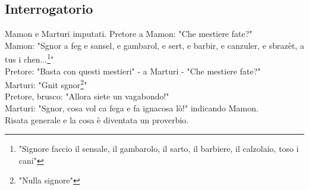 \subsection{Interrogatorio}
Mamon e Marturi imputati. Pretore a Mamon: "Che mestiere fate?"\\
Mamon: "Sgnor a feg e sansel, e gambarol, e sert, e barbir, e canzuler, e sbrazèt, a tus i chen...\footnote{"Signore faccio il sensale, il gambarolo, il sarto, il barbiere, il calzolaio, toso i cani"}"\\
Pretore: "Basta con questi mestieri" - a Marturi - "Che mestiere fate?"\\
Marturi: "Gnit sgnor\footnote{"Nulla signore"}"\\
Pretore, brusco: "Allora siete un vagabondo!"\\
Marturi: "Sgnor, cosa vol ca fega e fa ignacosa lò!" indicando Mamon.\\
Risata generale e la cosa è diventata un proverbio.

